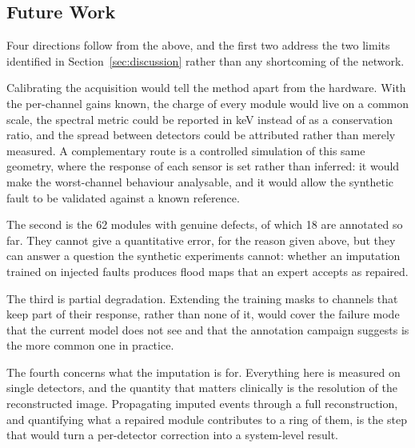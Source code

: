 \documentclass[10pt,conference]{IEEEtran}
\begin{document}
\subsection{Future Work}

Four directions follow from the above, and the first two address the two
limits identified in Section~\ref{sec:discussion} rather than any shortcoming of
the network.

Calibrating the acquisition would tell the method apart from the hardware. With
the per-channel gains known, the charge of every
module would live on a common scale, the spectral metric could be reported in
keV instead of as a conservation ratio, and the spread between detectors could
be attributed rather than merely measured. A complementary route is a
controlled simulation of this same geometry, where the response of each sensor
is set rather than inferred: it would make the worst-channel behaviour
analysable, and it would allow the synthetic fault to be validated against a
known reference.

The second is the 62 modules with genuine defects, of which 18 are annotated so
far. They cannot give a quantitative error, for the reason given above, but
they can answer a question the synthetic experiments cannot: whether an
imputation trained on injected faults produces flood maps that an expert
accepts as repaired.

The third is partial degradation. Extending the training masks to channels that
keep part of their response, rather than none of it, would cover the failure
mode that the current model does not see and that the annotation campaign
suggests is the more common one in practice.

The fourth concerns what the imputation is for. Everything here is measured on
single detectors, and the quantity that matters clinically is the resolution of
the reconstructed image. Propagating imputed events through a full
reconstruction, and quantifying what a repaired module contributes to a ring of
them, is the step that would turn a per-detector correction into a
system-level result.


\end{document}
